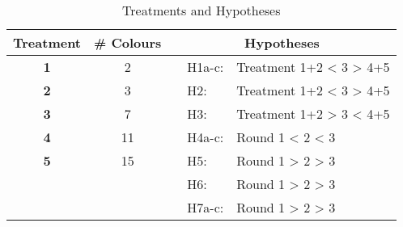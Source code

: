 \begin{table}[htbp] %
  \centering
  \caption{Treatments and Hypotheses}
  \label{tab:Hypotheses}
    \begin{tabular}{cc|rrr}
    \toprule
    \textbf{Treatment} & \textbf{\# Colours} & \multicolumn{3}{c}{\textbf{Hypotheses}} \\
    \midrule
    \textbf{1} & 2     &  & \multicolumn{1}{l}{H1a-c: } & \multicolumn{1}{l}{Treatment 1+2 < 3 > 4+5} \\
    \textbf{2} & 3     &       & \multicolumn{1}{l}{H2: } & \multicolumn{1}{l}{Treatment 1+2 < 3 > 4+5} \\
    \textbf{3} & 7    &    &  \multicolumn{1}{l}{H3: } & \multicolumn{1}{l}{Treatment 1+2 > 3 < 4+5} \\
    \textbf{4} & 11    &    &  \multicolumn{1}{l}{H4a-c: } & \multicolumn{1}{l}{Round 1 < 2 < 3} \\
    \textbf{5} &  15	   &    &  \multicolumn{1}{l}{H5: } & \multicolumn{1}{l}{Round 1 > 2 > 3} \\
     & 		&    &  \multicolumn{1}{l}{H6: } & \multicolumn{1}{l}{Round 1 > 2 > 3} \\
     & 		&    &  \multicolumn{1}{l}{H7a-c: } & \multicolumn{1}{l}{Round 1 > 2 > 3} \\
    \bottomrule
    \end{tabular}%
\end{table}%
%
%
%
%

